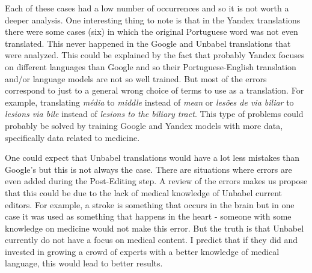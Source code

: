 Each of these cases had a low number of occurrences and so it is not worth a deeper analysis. One interesting thing to note is that in the Yandex translations there were some cases (six) in which the original Portuguese word was not even translated. This never happened in the Google and Unbabel translations that were analyzed. This could be explained by the fact that probably Yandex focuses on different languages than Google and so their Portuguese-English translation and/or language models are not so well trained. But most of the errors correspond to just to a general wrong choice of terms to use as a translation. For example, translating \textit{média} to \textit{middle} instead of \textit{mean} or \textit{lesões de via biliar} to \textit{lesions via bile} instead of \textit{lesions to the biliary tract}. This type of problems could probably be solved by training Google and Yandex models with more data, specifically data related to medicine.

One could expect that Unbabel translations would have a lot less mistakes than Google's but this is not always the case. There are situations where errors are even added during the Post-Editing step. A review of the errors makes us propose that this could be due to the lack of medical knowledge of Unbabel current editors. For example, a stroke is something that occurs in the brain but in one case it was used as something that happens in the heart - someone with some knowledge on medicine would not make this error. But the truth is that Unbabel currently do not have a focus on medical content. I predict that if they did and invested in growing a crowd of experts with a better knowledge of medical language, this would lead to better results.


  
